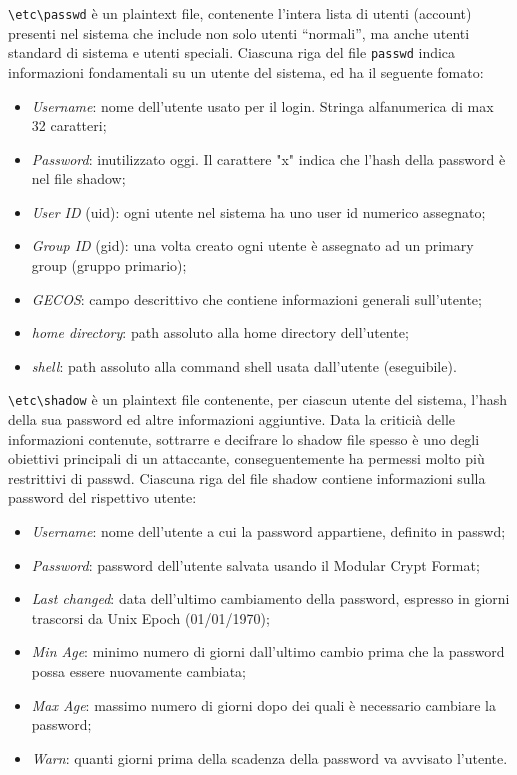\verb|\etc\passwd| è un plaintext file, contenente l'intera lista di utenti (account) presenti nel sistema che include non solo utenti “normali”, ma anche utenti standard di sistema e utenti speciali. Ciascuna riga del file \verb|passwd| indica informazioni fondamentali su un utente del sistema, ed ha il seguente fomato:
\begin{itemize}
    \item \textit{Username}: nome dell'utente usato per il login. Stringa alfanumerica di max 32 caratteri;
    \item \textit{Password}: inutilizzato oggi. Il carattere "x" indica che l'hash della password è nel file shadow;
    \item \textit{User ID} (uid): ogni utente nel sistema ha uno user id numerico assegnato;
    \item \textit{Group ID} (gid): una volta creato ogni utente è assegnato ad un primary group (gruppo primario);
    \item \textit{GECOS}: campo descrittivo che contiene informazioni generali sull'utente;
    \item \textit{home directory}: path assoluto alla home directory dell'utente;
    \item \textit{shell}: path assoluto alla command shell usata dall'utente (eseguibile).
\end{itemize}

\verb|\etc\shadow| è un plaintext file contenente, per ciascun utente del sistema, l'hash della sua password ed altre informazioni aggiuntive. Data la criticià delle informazioni contenute, sottrarre e decifrare lo shadow file spesso è uno degli obiettivi principali di un attaccante, conseguentemente ha permessi molto più restrittivi di passwd. Ciascuna riga del file shadow contiene informazioni sulla password del rispettivo utente:
\begin{itemize}
    \item \textit{Username}: nome dell'utente a cui la password appartiene, definito in passwd;
    \item \textit{Password}: password dell'utente salvata usando il Modular Crypt Format;
    \item \textit{Last changed}: data dell'ultimo cambiamento della password, espresso in giorni trascorsi da Unix Epoch (01/01/1970);
    \item \textit{Min Age}: minimo numero di giorni dall'ultimo cambio prima che la password possa essere nuovamente cambiata;
    \item \textit{Max Age}: massimo numero di giorni dopo dei quali è necessario cambiare la password;
    \item \textit{Warn}: quanti giorni prima della scadenza della password va avvisato l'utente.
\end{itemize}

